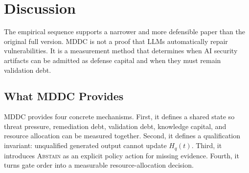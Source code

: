 ﻿\documentclass[lettersize,journal]{IEEEtran}
\begin{document}
\section{Discussion}
The empirical sequence supports a narrower and more defensible paper than the original full version. MDDC is not a proof that LLMs automatically repair vulnerabilities. It is a measurement method that determines when AI security artifacts can be admitted as defense capital and when they must remain validation debt.

\subsection{What MDDC Provides}
MDDC provides four concrete mechanisms. First, it defines a shared state so threat pressure, remediation debt, validation debt, knowledge capital, and resource allocation can be measured together. Second, it defines a qualification invariant: unqualified generated output cannot update $H_q(t)$. Third, it introduces \textsc{Abstain} as an explicit policy action for missing evidence. Fourth, it turns gate order into a measurable resource-allocation decision.
\end{document}
